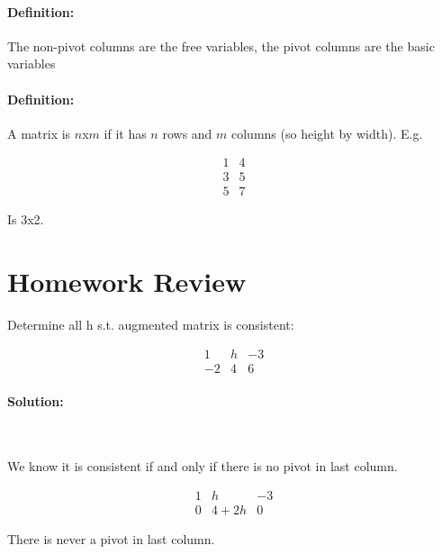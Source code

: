\documentclass[11pt]{report}
\newenvironment{solution}{\paragraph{\small Solution:}}{\hfill}
\newenvironment{definition}{\paragraph{Definition:}}{\hfill}
\newenvironment{problem}[2][Problem]{\begin{trivlist}
   \item[\hskip \labelsep {\bfseries #1}\hskip \labelsep {\bfseries #2.}]}{\end{trivlist}}
\begin{document}
\begin{definition}
	The non-pivot columns are the free variables, the pivot columns are the basic variables
\end{definition}


\begin{definition}
	A matrix is $n$x$m$ if it has $n$ rows and $m$ columns (so height by width).
	E.g. 
	\begin{center}
	\[\begin{matrix}{}
	  1 & 4 \\
	  3 & 5 \\
	  5 & 7
	\end{matrix}\]

	\end{center}

	Is 3x2.
\end{definition}

\section{Homework Review}


\begin{problem}{20}
	Determine all h s.t. augmented matrix is consistent:
	
	\[\begin{matrix}{}
  	1& h& -3 \\
  	-2& 4& 6 
	\end{matrix}\]

	
	
	\begin{solution}\
	
	We know it is consistent if and only if there is no pivot in last column.

	
	\[\begin{matrix}{}
  	1& h& -3 \\
  	0& 4 + 2h & 0 
	\end{matrix}\]

	
	There is never a pivot in last column.

		
	\end{solution}
	
\end{problem}
\end{document}
